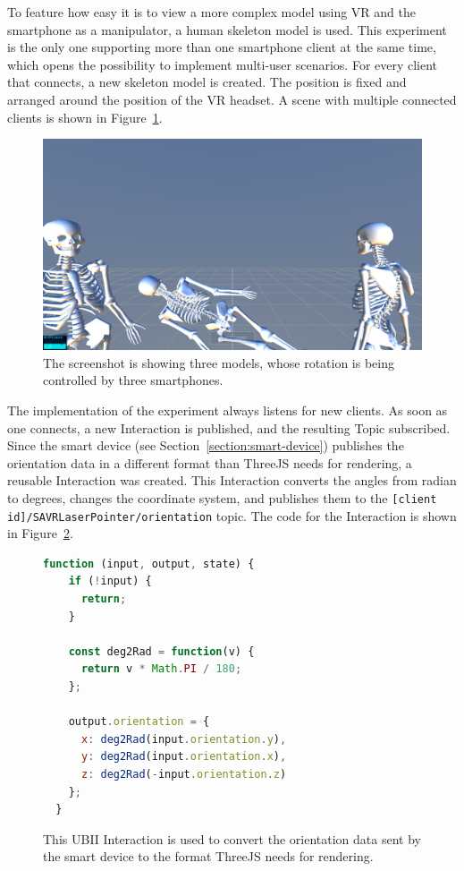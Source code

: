 To feature how easy it is to view a more complex model using \gls{VR} and the smartphone as a manipulator, a human skeleton model is used. This experiment is the only one supporting more than one smartphone client at the same time, which opens the possibility to implement multi-user scenarios. For every client that connects, a new skeleton model is created. The position is fixed and arranged around the position of the \gls{VR} headset. A scene with multiple connected clients is shown in Figure~\ref{fig:screenshot-exp-mv}.

\begin{figure}[H]
	\centering
	\includegraphics[width=12cm]{figures/experiments/screenshot_exp_mv.png}
	\caption[Screenshot of the model viewer]{The screenshot is showing three models, whose rotation is being controlled by three smartphones.}\label{fig:screenshot-exp-mv}
\end{figure}

The implementation of the experiment always listens for new clients. As soon as one connects, a new Interaction is published, and the resulting Topic subscribed. Since the smart device (see Section~\ref{section:smart-device}) publishes the orientation data in a different format than ThreeJS needs for rendering, a reusable Interaction was created. This Interaction converts the angles from radian to degrees, changes the coordinate system, and publishes them to the \lstinline[breaklines=true]{[client id]/SAVRLaserPointer/orientation} topic. The code for the Interaction is shown in Figure~\ref{fig:ubii-interaction-angles}.

\begin{figure}[H]
	\begin{lstlisting}[language=JavaScript]
  function (input, output, state) {
    if (!input) {
      return;
    }

    const deg2Rad = function(v) {
      return v * Math.PI / 180;
    };

    output.orientation = {
      x: deg2Rad(input.orientation.y),
      y: deg2Rad(input.orientation.x),
      z: deg2Rad(-input.orientation.z)
    };
  }
 \end{lstlisting}
  \caption[A UBII Interaction of model viewer]{This \gls{UBII} Interaction is used to convert the orientation data sent by the smart device to the format ThreeJS needs for rendering.}\label{fig:ubii-interaction-angles} %
\end{figure}

